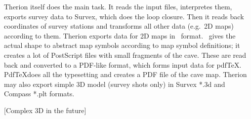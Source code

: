 Therion itself does the main task. It reads the input files, interpretes them, 
exports survey data to Survex, which does the loop closure. Then it reads back 
coordinates of survey stations and transforms all other data (e.g.~2D maps) 
according to them. Therion exports data for 2D maps in \MP\ format. \MP\ gives 
the actual shape to abstract map symbols according to map symbol definitions; it
creates a lot of PostScript files with small fragments of the cave. These are 
read back and converted to a PDF-like format, which forms input data 
for pdf\TeX. Pdf\TeX does all the typesetting and creates a PDF file of the cave 
map. Therion may also export simple 3D model (survey shots only) in Survex *.3d 
and Compass *.plt formats. 

[Complex 3D in the future]





\endinput

